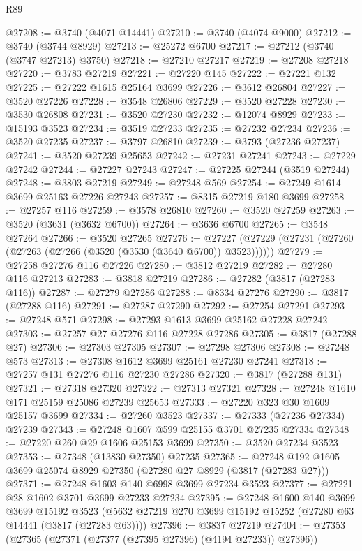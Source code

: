 \begin{lexlean}{R89}
\begin{coremodule}
@27208 := @3740 (@4071 @14441)
@27210 := @3740 (@4074 @9000)
@27212 := @3740 (@3744 @8929)
@27213 := @25272 @6700
@27217 := @27212 (@3740 (@3747 @27213) @3750)
@27218 := @27210 @27217
@27219 := @27208 @27218
@27220 := @3783 @27219
@27221 := @27220 @145
@27222 := @27221 @132
@27225 := @27222 @1615 @25164 @3699
@27226 := @3612 @26804
@27227 := @3520 @27226
@27228 := @3548 @26806
@27229 := @3520 @27228
@27230 := @3530 @26808
@27231 := @3520 @27230
@27232 := @12074 @8929
@27233 := @15193 @3523
@27234 := @3519 @27233
@27235 := @27232 @27234
@27236 := @3520 @27235
@27237 := @3797 @26810
@27239 := @3793 (@27236 @27237)
@27241 := @3520 @27239 @25653
@27242 := @27231 @27241
@27243 := @27229 @27242
@27244 := @27227 @27243
@27247 := @27225 @27244 (@3519 @27244)
@27248 := @3803 @27219
@27249 := @27248 @569
@27254 := @27249 @1614 @3699 @25163 @27226 @27243
@27257 := @8315 @27219 @180 @3699
@27258 := @27257 @116
@27259 := @3578 @26810
@27260 := @3520 @27259
@27263 := @3520 (@3631 (@3632 @6700))
@27264 := @3636 @6700
@27265 := @3548 @27264
@27266 := @3520 @27265
@27276 := @27227 (@27229 (@27231 (@27260 (@27263 (@27266 (@3520 (@3530 (@3640 @6700)) @3523))))))
@27279 := @27258 @27276 @116 @27226
@27280 := @3812 @27219
@27282 := @27280 @116 @27213
@27283 := @3818 @27219
@27286 := @27282 (@3817 (@27283 @116))
@27287 := @27279 @27286
@27288 := @8334 @27276
@27290 := @3817 (@27288 @116)
@27291 := @27287 @27290
@27292 := @27254 @27291
@27293 := @27248 @571
@27298 := @27293 @1613 @3699 @25162 @27228 @27242
@27303 := @27257 @27 @27276 @116 @27228 @27286
@27305 := @3817 (@27288 @27)
@27306 := @27303 @27305
@27307 := @27298 @27306
@27308 := @27248 @573
@27313 := @27308 @1612 @3699 @25161 @27230 @27241
@27318 := @27257 @131 @27276 @116 @27230 @27286
@27320 := @3817 (@27288 @131)
@27321 := @27318 @27320
@27322 := @27313 @27321
@27328 := @27248 @1610 @171 @25159 @25086 @27239 @25653
@27333 := @27220 @323 @30 @1609 @25157 @3699
@27334 := @27260 @3523
@27337 := @27333 (@27236 @27334) @27239
@27343 := @27248 @1607 @599 @25155 @3701 @27235 @27334
@27348 := @27220 @260 @29 @1606 @25153 @3699
@27350 := @3520 @27234 @3523
@27353 := @27348 (@13830 @27350) @27235
@27365 := @27248 @192 @1605 @3699 @25074 @8929 @27350 (@27280 @27 @8929 (@3817 (@27283 @27)))
@27371 := @27248 @1603 @140 @6998 @3699 @27234 @3523
@27377 := @27221 @28 @1602 @3701 @3699 @27233 @27234
@27395 := @27248
    @1600
    @140
    @3699
    @3699
    @15192
    @3523
    (@5632 @27219 @270 @3699 @15192 @15252 (@27280 @63 @14441 (@3817 (@27283 @63))))
@27396 := @3837 @27219
@27404 := @27353 (@27365 (@27371 (@27377 (@27395 @27396) (@4194 @27233)) @27396))

\end{coremodule}
\end{lexlean}
